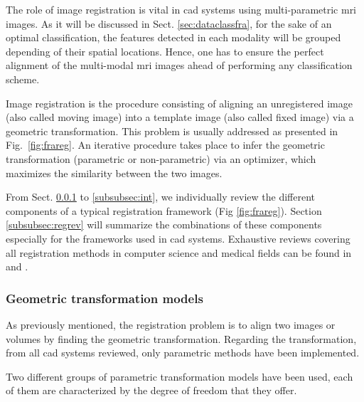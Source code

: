 The role of image registration is vital in \ac{cad} systems using multi-parametric \ac{mri} images. As it will be discussed in Sect. \ref{sec:dataclassfra}, for the sake of an optimal classification, the features detected in each modality will be grouped depending of their spatial locations. Hence, one has to ensure the perfect alignment of the multi-modal \ac{mri} images ahead of performing any classification scheme.

Image registration is the procedure consisting of aligning an unregistered image (also called moving image) into a template image (also called fixed image) via a geometric transformation. This problem is usually addressed as presented in Fig.~\ref{fig:frareg}. An iterative procedure takes place to infer the geometric transformation (parametric or non-parametric) via an optimizer, which maximizes the similarity between the two images.

From Sect. \ref{subsubsec:geotra} to \ref{subsubsec:int}, we individually review the different components of a typical registration framework (Fig \ref{fig:frareg}). Section \ref{subsubsec:regrev} will summarize the combinations of these components especially for the frameworks used in \ac{cad} systems. Exhaustive reviews covering all registration methods in computer science and medical fields can be found in \cite{Maintz1998} and \cite{Zitova2003}.

\subsubsection{Geometric transformation models}\label{subsubsec:geotra}

As previously mentioned, the registration problem is to align two images or volumes by finding the geometric transformation. Regarding the transformation, from all \ac{cad} systems reviewed, only parametric methods have been implemented.

Two different groups of parametric transformation models have been used, each of them are characterized by the degree of freedom that they offer.

